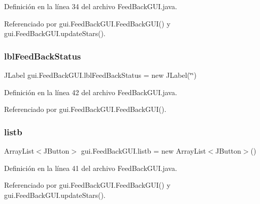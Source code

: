 Definición en la línea 34 del archivo Feed\+Back\+G\+U\+I.\+java.



Referenciado por gui.\+Feed\+Back\+G\+U\+I.\+Feed\+Back\+G\+U\+I() y gui.\+Feed\+Back\+G\+U\+I.\+update\+Stars().

\mbox{\label{classgui_1_1_feed_back_g_u_i_ae6b839a011e80bf88d8135d3f649f708}} 
\subsubsection{\texorpdfstring{lblFeedBackStatus}{lblFeedBackStatus}}
{\footnotesize\ttfamily J\+Label gui.\+Feed\+Back\+G\+U\+I.\+lbl\+Feed\+Back\+Status = new J\+Label(\char`\"{}\char`\"{})\hspace{0.3cm}{\ttfamily [private]}}



Definición en la línea 42 del archivo Feed\+Back\+G\+U\+I.\+java.



Referenciado por gui.\+Feed\+Back\+G\+U\+I.\+Feed\+Back\+G\+U\+I().

\mbox{\label{classgui_1_1_feed_back_g_u_i_aebe4840fd7ffe833e3c8976aba4f5dba}} 
\subsubsection{\texorpdfstring{listb}{listb}}
{\footnotesize\ttfamily Array\+List$<$J\+Button$>$ gui.\+Feed\+Back\+G\+U\+I.\+listb = new Array\+List$<$J\+Button$>$()\hspace{0.3cm}{\ttfamily [private]}}



Definición en la línea 41 del archivo Feed\+Back\+G\+U\+I.\+java.



Referenciado por gui.\+Feed\+Back\+G\+U\+I.\+Feed\+Back\+G\+U\+I() y gui.\+Feed\+Back\+G\+U\+I.\+update\+Stars().

\mbox{\label{classgui_1_1_feed_back_g_u_i_ad24dea21bb9450474fd58c7dba162f7e}} 
